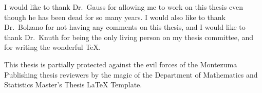 \documentclass{sdsu-thesis}
\theoremstyle{dtm}
\begin{document}
\listoftables


\listoffigures


\begin{glossarypage}
  \glsaddall\printglossary[title=]
\end{glossarypage}


\begin{acknowledgments}
  I would like to thank Dr.~Gauss for allowing me to work on this
  thesis even though he has been dead for so many years.  I would also
  like to thank Dr.~Bolzano for not having any comments on this thesis,
  and I would like to thank Dr.~Knuth for being the only living person
  on my thesis committee, and for writing the wonderful \TeX.

  This thesis is partially protected against the evil forces of the
  Montezuma Publishing thesis reviewers by the magic of the Department
  of Mathematics and Statistics Master's Thesis \LaTeX{} Template.
\end{acknowledgments}

%
%


% 
% 


% 
% 
%


\end{document}
